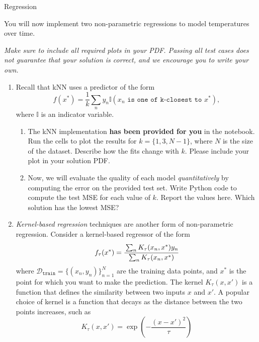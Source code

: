 \documentclass[submit]{harvardml}
\begin{document}
\begin{center}
  {\Large Regression}
\end{center}
  
\begin{problem}

You will now implement two non-parametric regressions to model temperatures over time.  

\vspace{0.5cm}
\noindent\emph{Make sure to include all required plots in your PDF. Passing all test cases does not guarantee that your solution is correct, and we encourage you to write your own. }

\begin{enumerate}
\item 
 Recall that kNN uses a predictor of the form
\[
  f(x^*) = \frac{1}{k} \sum_n y_n \mathbb{I}(x_n \texttt{ is one of k-closest to } x^*),
\]
where $\mathbb{I}$ is an indicator variable. 
\begin{enumerate}

  \item The kNN implementation \textbf{has been provided for you} in the notebook. Run the cells to plot the results for $k=\{1, 3, N-1\}$, where $N$ is the size of the dataset. Describe how the fits change with $k$. Please include your plot in your solution PDF.

  \item Now, we will evaluate the quality of each model \emph{quantitatively} by computing the error on the provided test set. Write Python code to compute the test MSE for each value of $k$.  Report the values here. Which solution has the lowest MSE? 
  
\end{enumerate}

\item \textit{Kernel-based regression} techniques are another form of non-parametric regression. Consider a kernel-based
regressor of the form 
\begin{equation*}
  f_\tau(x^*) = \cfrac{\sum_{n} K_\tau(x_n,x^*) y_n}{\sum_n K_\tau(x_n, x^*)}
\end{equation*}
where $\mathcal{D}_\texttt{train} = \{(x_n,y_n)\}_{n = 1} ^N$ are the
training data points, and $x^*$ is the point for which you want to
make the prediction.  The kernel $K_\tau(x,x')$ is a function that
defines the similarity between two inputs $x$ and $x'$. A popular
choice of kernel is a function that decays as the distance between the
two points increases, such as
\begin{equation*}
  K_\tau(x,x') = \exp\left(-\frac{(x-x')^2}{\tau}\right)
\end{equation*}


\end{enumerate}
\end{problem}
\end{document}

